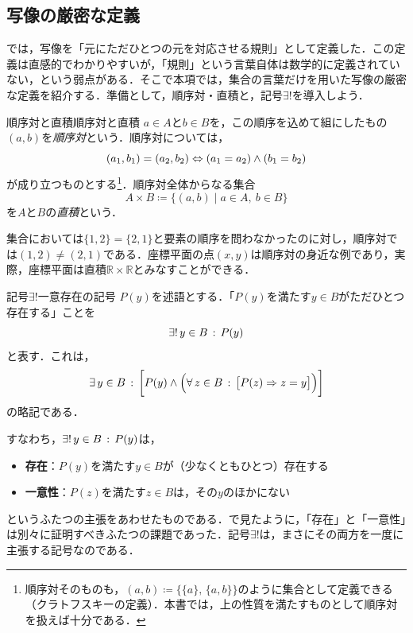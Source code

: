 \subsection{写像の厳密な定義}

では，写像を「元にただひとつの元を対応させる規則」として定義した．この定義は直感的でわかりやすいが，「規則」という言葉自体は数学的に定義されていない，という弱点がある．そこで本項では，集合の言葉だけを用いた写像の厳密な定義を紹介する．準備として，順序対・直積と，記号$\exists!$を導入しよう．

\begin{definition}{順序対と直積}{順序対と直積}
  $a \in A$と$b \in B$を，この順序を込めて組にしたもの$(a, b)$を\emph{順序対}という．順序対については，
  \[
    (a_1, b_1) = (a_2, b_2)
    \mathrel{\Leftrightarrow}
    (a_1 = a_2) \land (b_1 = b_2)
  \]
  が成り立つものとする\footnote{順序対そのものも，$(a, b) \coloneqq \{ \{a\},\, \{a, b\} \}$のように集合として定義できる（クラトフスキーの定義）．本書では，上の性質を満たすものとして順序対を扱えば十分である．}．順序対全体からなる集合
  \[
    A \times B \coloneqq \{ (a, b) \mid a \in A,\ b \in B \}
  \]
  を$A$と$B$の\emph{直積}という．
\end{definition}

集合においては$\{1, 2\} = \{2, 1\}$と要素の順序を問わなかったのに対し，順序対では$(1, 2) \ne (2, 1)$である．座標平面の点$(x, y)$は順序対の身近な例であり，実際，座標平面は直積$\mathbb{R} \times \mathbb{R}$とみなすことができる．

\begin{definition}{記号$\exists!$}{一意存在の記号}
  $P(y)$を述語とする．「$P(y)$を満たす$y \in B$がただひとつ存在する」ことを
  \[
    \exists!\, y \in B \,:\, P(y)
  \]
  と表す．これは，
  \[
    \exists\, y \in B \,:\, \biggl[ P(y) \land \Bigl( \forall\, z \in B \,:\, \bigl[ P(z) \mathrel{\Rightarrow} z = y \bigr] \Bigr) \biggr]
  \]
  の略記である．
\end{definition}

すなわち，$\exists!\, y \in B \,:\, P(y)$は，
\begin{itemize}
  \item \textbf{存在}：$P(y)$を満たす$y \in B$が（少なくともひとつ）存在する
  \item \textbf{一意性}：$P(z)$を満たす$z \in B$は，その$y$のほかにない
\end{itemize}
というふたつの主張をあわせたものである．で見たように，「存在」と「一意性」は別々に証明すべきふたつの課題であった．記号$\exists!$は，まさにその両方を一度に主張する記号なのである．

